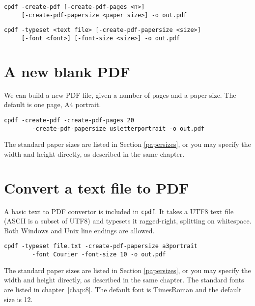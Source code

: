 \documentclass{book}
\begin{document}
  {\small\begin{framed}
  \noindent\verb!cpdf -create-pdf [-create-pdf-pages <n>]!\\
  \noindent\verb!     [-create-pdf-papersize <paper size>] -o out.pdf!

  \vspace{1.5mm}
  \noindent\verb!cpdf -typeset <text file> [-create-pdf-papersize <size>]!\\
  \noindent\verb!     [-font <font>] [-font-size <size>] -o out.pdf!

  \end{framed}}

\section{A new blank PDF}

We can build a new PDF file, given a number of pages and a paper size. The default is one page, A4 portrait.

\begin{framed}
 \small\verb?cpdf -create-pdf -create-pdf-pages 20?\\
 \noindent\small\verb?        -create-pdf-papersize usletterportrait -o out.pdf?
\end{framed}

\noindent The standard paper sizes are listed in Section \ref{papersizes}, or you may specify the width and height directly, as described in the same chapter.

\section{Convert a text file to PDF}

A basic text to PDF convertor is included in \texttt{cpdf}. It takes a UTF8 text file (ASCII is a subset of UTF8) and typesets it ragged-right, splitting on whitespace. Both Windows and Unix line endings are allowed. 

\begin{framed}
 \small\verb?cpdf -typeset file.txt -create-pdf-papersize a3portrait?\\
 \noindent\small\verb?        -font Courier -font-size 10 -o out.pdf?
\end{framed}

\noindent The standard paper sizes are listed in Section \ref{papersizes}, or you may specify the width and height directly, as described in the same chapter. The standard fonts are listed in chapter~\ref{chap:8}. The default font is TimesRoman and the default size is 12.
\end{document}
